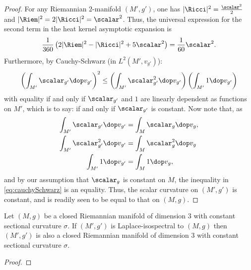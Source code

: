 \begin{proof}
  For any Riemannian $2$-manifold $(M',g')$, one has $|\Ricci|^2 = \frac{\scalar^2}{2}$ and $|\Riem|^2 = 2 |\Ricci|^2 = \scalar^2$. Thus, the universal expression for the second term in the heat kernel asymptotic expansion is
  \begin{align}
    \frac{1}{360}\left(2| \Riem |^2 - |\Ricci|^2 + 5 \scalar^2\right) =\frac{1}{60} \scalar^2.
  \end{align}
  Furthermore, by Cauchy-Schwarz (in $L^2(M',v_{g'})$):
  \begin{align}\label{eq:cauchySchwarz}
    \left( \int_{M'} \scalar_{g'} \dop v_{g'} \right)^2 \leq \left( \int_{M'} \scalar_{g'}^2 \dop v_{g'} \right)\left( \int_{M'} 1 \dop v_{g'} \right)
  \end{align}
  with equality if and only if $\scalar_{g'}$ and $1$ are linearly dependent as functions on $M'$, which is to say: if and only if $\scalar_{g'}$ is constant.
  Now note that, as
  \begin{align}
    \int_{M'}\scalar_{g'}\dop v_{g'}   & =\int_{M}\scalar_{g}\dop v_{g},  \\
    \int_{M'}\scalar_{g'}^2\dop v_{g'} & =\int_{M}\scalar_{g}^2\dop v_{g} \\
    \int_{M'}1\dop v_{g'}              & =\int_{M}1\dop v_{g},
  \end{align}
  and by our assumption that $\scalar_g$ is constant on $M$, the inequality in \ref{eq:cauchySchwarz} is an equality. Thus, the scalar curvature on $(M',g')$ is constant, and is readily seen to be equal to that on $(M,g)$.
\end{proof}
\begin{proposition}
  Let $(M,g)$ be a closed Riemannian manifold of dimension $3$ with constant sectional curvature $\sigma$. If $(M',g')$ is Laplace-isospectral to $(M,g)$ then $(M',g')$ is also a closed Riemannian manifold of dimension $3$ with constant sectional curvature $\sigma$.
\end{proposition}
\begin{proof}

\end{proof}


\newpage



